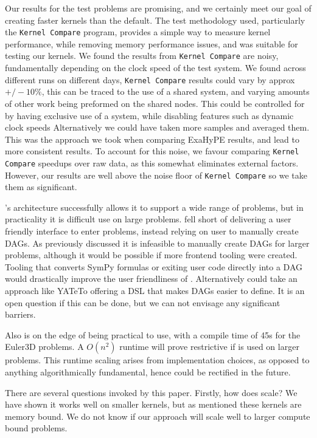 Our results for the test problems are promising, and we certainly meet our goal of creating faster kernels than the default.
The test methodology used, particularly the \texttt{Kernel Compare} program, provides a simple way to measure kernel performance, while removing memory performance issues, and was suitable for testing our kernels.
We found the results from \texttt{Kernel Compare} are noisy, fundamentally depending on the clock speed of the test system.
We found across different runs on different days, \texttt{Kernel Compare} results could vary by approx $+/-10\%$, this can be traced to the use of a shared system, and varying amounts of other work being preformed on the shared nodes.
This could be controlled for by having exclusive use of a system, while disabling features such as dynamic clock speeds
Alternatively we could have taken more samples and averaged them.
This was the approach we took when comparing ExaHyPE results, and lead to more consistent results.
To account for this noise, we favour comparing \texttt{Kernel Compare} speedups over raw data, as this somewhat eliminates external factors.
However, our results are well above the noise floor of \texttt{Kernel Compare} so we take them as significant.

\phlat{}'s architecture successfully allows it to support a wide range of problems, but in practicality it is difficult use \phlat on large problems.
\phlat fell short of delivering a user friendly interface to enter problems, instead relying on user to manually create DAGs.
As previously discussed it is infeasible to manually create DAGs for larger problems, although it would be possible if more frontend tooling were created.
Tooling that converts SymPy formulas \cite{sympy} or exiting user code directly into a DAG would drastically improve the user friendliness of \phlat.
Alternatively \phlat could take an approach like YATeTo \cite{YATeTo} offering a DSL that makes DAGs easier to define.
It is an open question if this can be done, but we can not envisage any significant barriers.

Also \phlat is on the edge of being practical to use, with a compile time of 45s for the Euler3D problems.
A $O(n^2)$ runtime will prove restrictive if \phlat is used on larger problems.
This runtime scaling arises from implementation choices, as opposed to anything algorithmically fundamental, hence could be rectified in the future.

There are several questions invoked by this paper.
Firstly, how does \phlat scale?
We have shown it works well on smaller kernels, but as mentioned these kernels are memory bound.
We do not know if our approach will scale well to larger compute bound problems.

